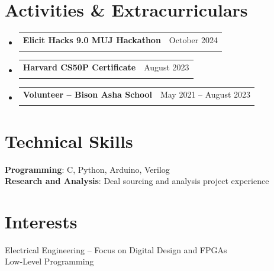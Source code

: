 \documentclass[letterpaper,11pt]{article}
\makeatletter
\newcommand{\resumeSubheading}[4]{
  \vspace{-2pt}\item
    \begin{tabular*}{0.97\textwidth}[t]{l@{\extracolsep{\fill}}r}
      \textbf{#1} & #2 \\
      \textit{\small#3} & \textit{\small #4} \\
    \end{tabular*}\vspace{-7pt}
}
\newcommand{\resumeSubHeadingListStart}{\begin{itemize}[leftmargin=0.15in, label={}]}
\newcommand{\resumeSubHeadingListEnd}{\end{itemize}}
\makeatother
\begin{document}
\section{Activities \& Extracurriculars}
  \resumeSubHeadingListStart
    \resumeSubheading
      {Elicit Hacks 9.0 MUJ Hackathon}{October 2024}
      {}{}
    \resumeSubheading
      {Harvard CS50P Certificate}{August 2023}
      {}{}
    \resumeSubheading
      {Volunteer – Bison Asha School}{May 2021 -- August 2023}
      {}{}
  \resumeSubHeadingListEnd

\section{Technical Skills}
 \begin{itemize}[leftmargin=0.15in, label={}]
    \small{\item{
     \textbf{Programming}{: C, Python, Arduino, Verilog} \\
     \textbf{Research and Analysis}{: Deal sourcing and analysis project experience}
    }}
 \end{itemize}

\section{Interests}
 \begin{itemize}[leftmargin=0.15in, label={}]
    \small{\item{
     Electrical Engineering – Focus on Digital Design and FPGAs \\
     Low-Level Programming
    }}
 \end{itemize}
\end{document}
